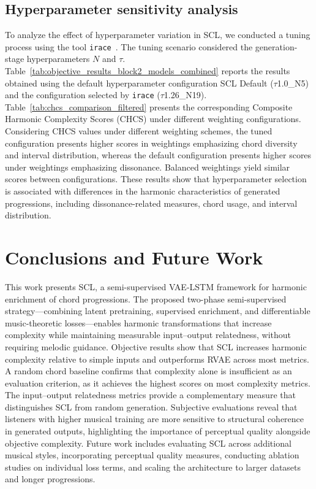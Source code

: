 \documentclass[conference]{IEEEtran}
\begin{document}
\subsection{Hyperparameter sensitivity analysis}
To analyze the effect of hyperparameter variation in SCL, we conducted a tuning process using the tool \texttt{irace}~\cite{LopDubPerStuBir2016irace}. The tuning scenario considered the generation-stage hyperparameters $N$ and $\tau$.
Table~\ref{tab:objective_results_block2_models_combined} reports the results obtained using the default hyperparameter configuration SCL Default ($\tau$1.0\_N5) and the configuration selected by \texttt{irace} ($\tau$1.26\_N19). Table~\ref{tab:chcs_comparison_filtered} presents the corresponding Composite Harmonic Complexity Scores (CHCS) under different weighting configurations. Considering CHCS values under different weighting schemes, the tuned configuration presents higher scores in weightings emphasizing chord diversity and interval distribution, whereas the default configuration presents higher scores under weightings emphasizing dissonance. Balanced weightings yield similar scores between configurations. These results show that hyperparameter selection is associated with differences in the harmonic characteristics of generated progressions, including dissonance-related measures, chord usage, and interval distribution.
\section{Conclusions and Future Work}
\label{sec:conclusions}

This work presents SCL, a semi-supervised VAE-LSTM framework for harmonic enrichment of chord progressions.
The proposed two-phase semi-supervised strategy---combining latent pretraining, supervised enrichment, and differentiable music-theoretic losses---enables harmonic transformations that increase complexity while maintaining measurable input--output relatedness, without requiring melodic guidance.
Objective results show that SCL increases harmonic complexity relative to simple inputs and outperforms RVAE across most metrics. A random chord baseline confirms that complexity alone is insufficient as an evaluation criterion, as it achieves the highest scores on most complexity metrics. The input--output relatedness metrics provide a complementary measure that distinguishes SCL from random generation. Subjective evaluations reveal that listeners with higher musical training are more sensitive to structural coherence in generated outputs, highlighting the importance of perceptual quality alongside objective complexity. Future work includes evaluating SCL across additional musical styles, incorporating perceptual quality measures, conducting ablation studies on individual loss terms, and scaling the architecture to larger datasets and longer progressions.
\end{document}

